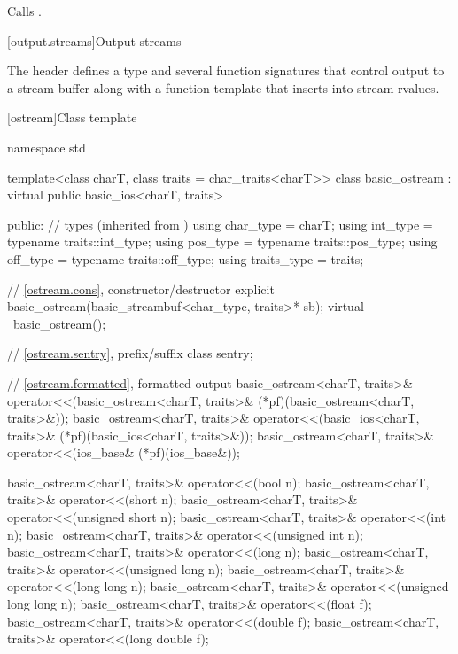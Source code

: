 \begin{itemdescr}
\pnum
\effects
Calls .
\end{itemdescr}


[output.streams]{Output streams}

\pnum
The header  defines a type
and several function signatures that control output to a
stream buffer along with a function template that inserts into stream rvalues.

[ostream]{Class template }

%
\begin{codeblock}
namespace std {
  template<class charT, class traits = char_traits<charT>>
  class basic_ostream : virtual public basic_ios<charT, traits> {
  public:
    // types (inherited from )
    using char_type   = charT;
    using int_type    = typename traits::int_type;
    using pos_type    = typename traits::pos_type;
    using off_type    = typename traits::off_type;
    using traits_type = traits;

    // \ref{ostream.cons}, constructor/destructor
    explicit basic_ostream(basic_streambuf<char_type, traits>* sb);
    virtual ~basic_ostream();

    // \ref{ostream.sentry}, prefix/suffix
    class sentry;

    // \ref{ostream.formatted}, formatted output
    basic_ostream<charT, traits>&
      operator<<(basic_ostream<charT, traits>& (*pf)(basic_ostream<charT, traits>&));
    basic_ostream<charT, traits>&
      operator<<(basic_ios<charT, traits>& (*pf)(basic_ios<charT, traits>&));
    basic_ostream<charT, traits>&
      operator<<(ios_base& (*pf)(ios_base&));

    basic_ostream<charT, traits>& operator<<(bool n);
    basic_ostream<charT, traits>& operator<<(short n);
    basic_ostream<charT, traits>& operator<<(unsigned short n);
    basic_ostream<charT, traits>& operator<<(int n);
    basic_ostream<charT, traits>& operator<<(unsigned int n);
    basic_ostream<charT, traits>& operator<<(long n);
    basic_ostream<charT, traits>& operator<<(unsigned long n);
    basic_ostream<charT, traits>& operator<<(long long n);
    basic_ostream<charT, traits>& operator<<(unsigned long long n);
    basic_ostream<charT, traits>& operator<<(float f);
    basic_ostream<charT, traits>& operator<<(double f);
    basic_ostream<charT, traits>& operator<<(long double f);

}}
\end{codeblock}
